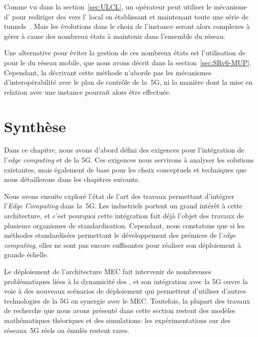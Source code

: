 \documentclass[../main.tex]{subfiles}
\begin{document}
Comme vu dans la section~\ref{sec:ULCL}, un opérateur peut utiliser le mécanisme d’ pour rediriger des  vers l’ local en établissant et maintenant toute une série de tunnels~. Mais les évolutions dans le choix de l’instance seront alors complexes à gérer à cause des nombreux états à maintenir dans l’ensemble du réseau.

Une alternative pour éviter la gestion de ces nombreux états est l’utilisation de  pour le  du réseau mobile, que nous avons décrit dans la section~\ref{sec:SRv6-MUP}.
Cependant, la  décrivant cette méthode n’aborde pas les mécanismes d’interopérabilité avec le plan de contrôle de la~5G, ni la manière dont la mise en relation avec une instance pourrait alors être effectuée.

\pagebreak
\section{Synthèse}
Dans ce chapitre, nous avons d’abord défini des exigences pour l’intégration de l’\textit{edge computing} et de la 5G. 
Ces exigences nous servirons à analyser les solutions existantes, mais également de base pour les choix conceptuels et techniques que nous détaillerons dans les chapitres suivants.

Nous avons ensuite exploré l’état de l’art des travaux permettant d’intégrer l’\textit{Edge Computing} dans la~5G.
Les industriels portent un grand intérêt à cette architecture, et c’est pourquoi cette intégration fait déjà l’objet des travaux de plusieurs organismes de standardisation.
Cependant, nous constatons que si les méthodes standardisées permettant le développement des prémices de l’\textit{edge computing}, elles ne sont pas encore suffisantes pour réaliser son déploiement à grande échelle.

Le déploiement de l’architecture MEC fait intervenir de nombreuses problématiques liées à la dynamicité des , et son intégration avec la 5G ouvre la voie à des nouveaux scénarios de déploiement qui permettent d’utiliser d’autres technologies de la 5G en synergie avec le MEC.
Toutefois, la plupart des travaux de recherche que nous avons présenté dans cette section restent des modèles mathématiques théoriques et des simulations: les expérimentations sur des réseaux~5G réels ou émulés restent rares.
\end{document}
